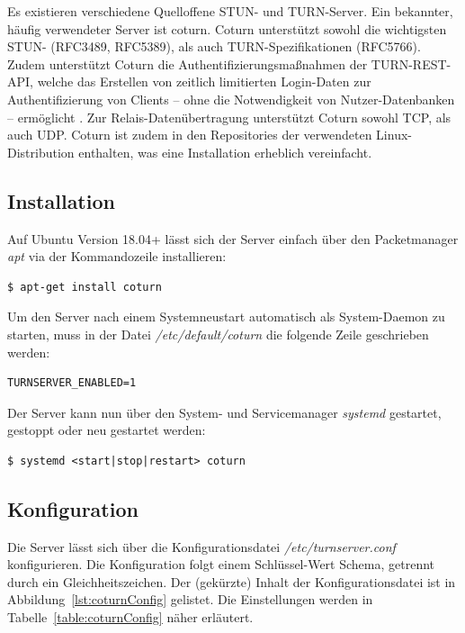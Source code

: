 Es existieren verschiedene Quelloffene \acs{STUN}- und \acs{TURN}-Server. Ein bekannter, häufig verwendeter Server ist \glqq{}coturn\grqq{}. Coturn unterstützt sowohl die wichtigsten \acs{STUN}- (RFC3489, RFC5389), als auch \acs{TURN}-Spezifikationen (RFC5766). Zudem unterstützt Coturn die Authentifizierungsmaßnahmen der \glqq{}TURN-REST-API\grqq{}, welche das Erstellen von zeitlich limitierten Login-Daten zur Authentifizierung von Clients -- ohne die Notwendigkeit von Nutzer-Datenbanken -- ermöglicht \cite{turnrestRFC}. Zur Relais-Datenübertragung unterstützt Coturn sowohl \acs{TCP}, als auch \acs{UDP}. Coturn ist zudem in den Repositories der verwendeten Linux-Distribution enthalten, was eine Installation erheblich vereinfacht.\par

\subsection{Installation}
Auf Ubuntu Version 18.04+ lässt sich der Server einfach über den Packetmanager \textit{apt} via der Kommandozeile installieren:
\lstset{style=STYLE_COMMAND_LINE_ARGUMENT_SINGLE_LINE}
\begin{lstlisting}[belowskip=-0.8 \baselineskip]
$ apt-get install coturn
\end{lstlisting}

Um den Server nach einem Systemneustart automatisch als System-Daemon zu starten, muss in der Datei \textit{/etc/default/coturn} die folgende Zeile geschrieben werden:
\lstset{style=STYLE_COMMAND_LINE_ARGUMENT_SINGLE_LINE}
\begin{lstlisting}[belowskip=-0.8 \baselineskip]
TURNSERVER_ENABLED=1
\end{lstlisting}

Der Server kann nun über den System- und Servicemanager \textit{systemd} gestartet, gestoppt oder neu gestartet werden:
\lstset{style=STYLE_COMMAND_LINE_ARGUMENT_SINGLE_LINE}
\begin{lstlisting}[belowskip=-0.8 \baselineskip]
$ systemd <start|stop|restart> coturn
\end{lstlisting}

\subsection{Konfiguration}
Die Server lässt sich über die Konfigurationsdatei \textit{/etc/turnserver.conf} konfigurieren. Die Konfiguration folgt einem Schlüssel-Wert Schema, getrennt durch ein Gleichheitszeichen. Der (gekürzte) Inhalt der Konfigurationsdatei ist in Abbildung~\ref{lst:coturnConfig} gelistet. Die Einstellungen werden in Tabelle~\ref{table:coturnConfig} näher erläutert.

